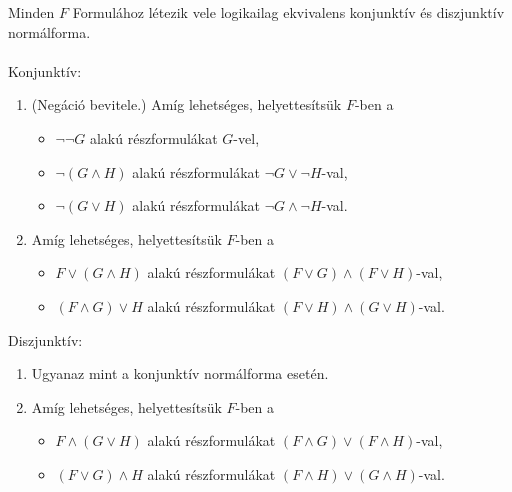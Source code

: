 \begin{frame}

\begin{tcolorbox}[squeezed title={Tétel: Konjunktív és diszjunktív normálforma létezése}]
Minden $F$ Formulához létezik vele logikailag ekvivalens konjunktív és diszjunktív normálforma.
\tcblower
\msmallskip
\underline{}\\
\mmedskip
\\
Konjunktív:
\begin{enumerate}
\color{black}
	\item (Negáció bevitele.) Amíg lehetséges, helyettesítsük $F$-ben a
	\begin{itemize}
		\item $\neg \neg G$ alakú részformulákat $G$-vel,
		\item $\neg (G \land H)$ alakú részformulákat $\neg G \lor \neg H$-val,
		\item $\neg (G \lor H)$ alakú részformulákat $\neg G \land \neg H$-val.
	\end{itemize}
	\item Amíg lehetséges, helyettesítsük $F$-ben a
	\begin{itemize}
		\item $F \lor (G \land H)$ alakú részformulákat $(F \lor G) \land (F \lor H)$-val,
		\item $(F \land G) \lor H$ alakú részformulákat $(F \lor H) \land (G \lor H)$-val.
	\end{itemize}
\end{enumerate}
\mbigskip
Diszjunktív:
\begin{enumerate}
	\item Ugyanaz mint a konjunktív normálforma esetén.
	\item Amíg lehetséges, helyettesítsük $F$-ben a
	\begin{itemize}
		\item $F \land (G \lor H)$ alakú részformulákat $(F \land G) \lor (F \land H)$-val,
		\item $(F \lor G) \land H$ alakú részformulákat $(F \land H) \lor (G \land H)$-val.
	\end{itemize}
\end{enumerate}
\end{tcolorbox}

\end{frame}


